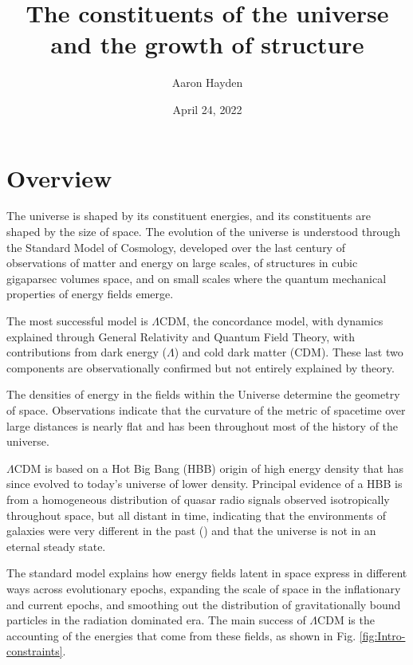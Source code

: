 \documentclass{paper}
\begin{document}
 

\title{The constituents of the universe and the growth of structure}
\author{Aaron Hayden}
\date{April 24, 2022}
\maketitle

\section*{Overview}
  The universe is shaped by its constituent energies, and its constituents are
  shaped by the size of space. The evolution of the universe is understood 
  through the Standard Model of Cosmology, developed over the last 
  century of observations of matter and energy on large scales, of structures 
  in cubic gigaparsec volumes space, and on small scales 
  where the quantum mechanical properties of energy fields emerge. 

  The most successful model is $\Lambda$CDM, the concordance model, with 
  dynamics explained through General Relativity and Quantum Field Theory, 
  with contributions from dark energy ($\Lambda$) and cold dark matter 
  (CDM). These last two components are observationally confirmed but not 
  entirely explained by theory. 

  The densities of energy in the fields within the Universe determine the 
  geometry of space.  Observations indicate that the curvature of the metric 
  of spacetime over large distances is nearly flat and has been throughout 
  most of the history of the universe.
  
  $\Lambda$CDM is based on a Hot Big Bang (HBB) origin of high energy density 
  that has since evolved to today's universe of lower density. 
  Principal evidence of a HBB is from a homogeneous distribution of 
  quasar radio signals observed isotropically throughout space, but all 
  distant in time, indicating that the environments of galaxies were very 
  different in the past (\cite{Secrest_2021}) and that the universe is not in 
  an eternal steady state. 

  The standard model explains how energy fields latent in space express in 
  different ways across evolutionary epochs, expanding the scale of 
  space in the inflationary and current epochs, and smoothing out the 
  distribution of gravitationally bound particles in the radiation dominated 
  era. The main success of $\Lambda$CDM is the accounting of the energies
  that come from these fields, as shown in Fig. \ref{fig:Intro-constraints}. 
\end{document}

